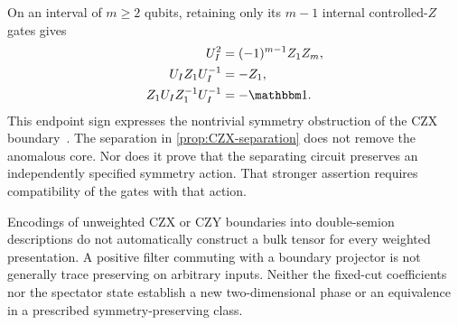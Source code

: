 On an interval of $m\geq2$ qubits, retaining only its $m-1$ internal
controlled-$Z$ gates gives
\begin{align}
	U_I^2                  & =(-1)^{m-1}Z_1Z_m, \\
	U_IZ_1U_I^{-1}         & =-Z_1,             \\
	Z_1U_IZ_1^{-1}U_I^{-1} & =-\Id.
\end{align}
This endpoint sign expresses the nontrivial symmetry obstruction of
the CZX boundary~\cite{CZX}. The separation in
\cref{prop:CZX-separation} does not remove the anomalous core.
Nor does it prove that the separating circuit preserves an
independently specified symmetry action. That stronger assertion
requires compatibility of the gates with that action.

Encodings of unweighted CZX or CZY boundaries into double-semion
descriptions do not automatically construct a bulk tensor for every
weighted presentation. A positive filter commuting with a boundary
projector is not generally trace preserving on arbitrary inputs.
Neither the fixed-cut coefficients nor the spectator state establish
a new two-dimensional phase or an equivalence in a prescribed
symmetry-preserving class.
